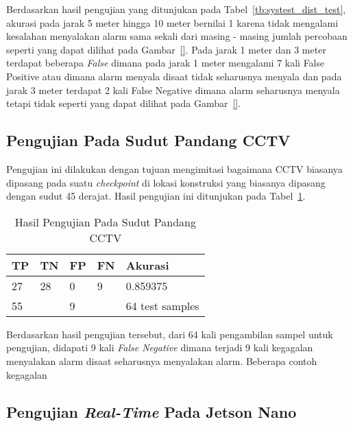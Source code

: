 \par Berdasarkan hasil pengujian yang ditunjukan pada Tabel~\ref{tb:systest_dist_test}, akurasi pada jarak 5 meter hingga 10 meter bernilai 1 karena tidak mengalami kesalahan menyalakan alarm sama sekali dari masing - masing jumlah percobaan seperti yang dapat dilihat pada Gambar~\ref{}. Pada jarak 1 meter dan 3 meter terdapat beberapa \emph{False} dimana pada jarak 1 meter mengalami 7 kali False Positive atau dimana alarm menyala disaat tidak seharusnya menyala dan pada jarak 3 meter terdapat 2 kali False Negative dimana alarm seharusnya menyala tetapi tidak seperti yang dapat dilihat pada Gambar~\ref{}.



\subsection{Pengujian Pada Sudut Pandang CCTV}
\label{subsec:systest_test_cctv}

\par Pengujian ini dilakukan dengan tujuan mengimitasi bagaimana CCTV biasanya dipasang pada suatu \emph{checkpoint} di lokasi konstruksi yang biasanya dipasang dengan sudut 45 derajat. Hasil pengujian ini ditunjukan pada Tabel~\ref{tb:systest_cctv}.


\begin{table}
    \centering
    \caption{Hasil Pengujian Pada Sudut Pandang CCTV}
    \label{tb:systest_cctv}
    \begin{tabular}{|l|l|l|l|l|} 
    \hline
    TP & TN & FP & FN & Akurasi         \\ 
    \hline
    27 & 28 & 0  & 9  & 0.859375         \\ 
    \hline
    \multicolumn{2}{|l|}{55}   & \multicolumn{2}{l|}{9} & 64 test samples  \\
    \hline
    \end{tabular}
\end{table}

Berdasarkan hasil pengujian tersebut, dari 64 kali pengambilan sampel untuk pengujian, didapati 9 kali \emph{False Negative} dimana terjadi 9 kali kegagalan menyalakan alarm disaat seharusnya menyalakan alarm. Beberapa contoh kegagalan 

\subsection{Pengujian \emph{Real-Time} Pada Jetson Nano}
\label{subsec:systest_test_jetsonrealtime}

